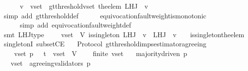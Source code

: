 \begin{isabellebody}
\ \ \ \ \isamarkupfalse%
\ {\isacartoucheopen}v\ {\isasymin}\ v{\isacharunderscore}set\ {\isasymand}\ gt{\isacharunderscore}threshold{\isacharparenleft}v{\isacharunderscore}set{\isacharcomma}\ the{\isacharunderscore}elem\ {\isacharparenleft}L{\isacharunderscore}H{\isacharunderscore}J\ {\isasymsigma}\ v{\isacharparenright}{\isacharparenright}{\isacartoucheclose}\ \isanewline
\ \ \ \ \isamarkupfalse%
\ {\isacharparenleft}simp\ add{\isacharcolon}\ gt{\isacharunderscore}threshold{\isacharunderscore}def{\isacharparenright}\isanewline
\ \ \ \ \isamarkupfalse%
\ equivocation{\isacharunderscore}fault{\isacharunderscore}weight{\isacharunderscore}is{\isacharunderscore}monotonic\ \ \ \ \ \ \ \ \ \ \isanewline
\ \ \ \ \isamarkupfalse%
\ {\isacharparenleft}simp\ add{\isacharcolon}\ equivocation{\isacharunderscore}fault{\isacharunderscore}weight{\isacharunderscore}def{\isacharparenright}\isanewline
\ \ \ \ \isamarkupfalse%
\ {\isacharparenleft}smt\ L{\isacharunderscore}H{\isacharunderscore}J{\isacharunderscore}type\ {\isacartoucheopen}{\isasymsigma}\ {\isasymin}\ {\isasymSigma}\ {\isasymand}\ v{\isacharunderscore}set\ {\isasymsubseteq}\ V{\isacartoucheclose}\ {\isacartoucheopen}is{\isacharunderscore}singleton\ {\isacharparenleft}L{\isacharunderscore}H{\isacharunderscore}J\ {\isasymsigma}\ v{\isacharparenright}\ {\isasymand}\ {\isacharparenleft}{\isasymforall}{\isasymsigma}{\isacharprime}{\isasymin}L{\isacharunderscore}H{\isacharunderscore}J\ {\isasymsigma}\ v{\isachardot}\ {\isasymsigma}{\isacharprime}\ {\isasymsubseteq}\ {\isasymsigma}{\isacharparenright}{\isacartoucheclose}\ is{\isacharunderscore}singleton{\isacharunderscore}the{\isacharunderscore}elem\ singletonI\ subsetCE{\isacharparenright}\ \isanewline
{}\isamarkupfalse%
%
\endisatagproof
{\isafoldproof}%
%
\isadelimproof
\isanewline
%
\endisadelimproof
\isanewline
\isanewline
{}\isamarkupfalse%
\ {\isacharparenleft}\ Protocol{\isacharparenright}\ gt{\isacharunderscore}threshold{\isacharunderscore}imps{\isacharunderscore}estimator{\isacharunderscore}agreeing\ {\isacharcolon}\isanewline
\ \ {\isachardoublequoteopen}{\isasymforall}\ {\isasymsigma}\ v{\isacharunderscore}set\ p{\isachardot}\ {\isasymsigma}\ {\isasymin}\ {\isasymSigma}t\ {\isasymand}\ v{\isacharunderscore}set\ {\isasymsubseteq}\ V\ \isanewline
\ \ {\isasymlongrightarrow}\ finite\ v{\isacharunderscore}set\isanewline
\ \ {\isasymlongrightarrow}\ majority{\isacharunderscore}driven\ p\isanewline
\ \ {\isasymlongrightarrow}\ v{\isacharunderscore}set\ {\isasymsubseteq}\ agreeing{\isacharunderscore}validators\ {\isacharparenleft}p{\isacharcomma}\ {\isasymsigma}{\isacharparenright}\isanewline

\end{isabellebody}
